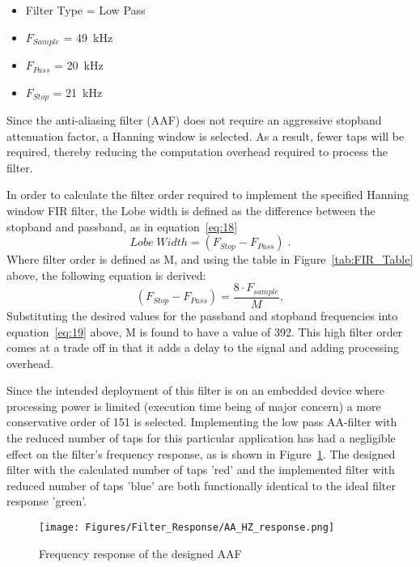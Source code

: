 \begin{itemize}
    \item Filter Type = Low Pass 
    \item $F_{Sample}$ = \qty{49}{\kHz} 
    \item $F_{Pass}$   = \qty{20}{\kHz} 
    \item $F_{Stop}$   = \qty{21}{\kHz} 
\end{itemize}
Since the  anti-aliasing filter (AAF) does not require an aggressive stopband attenuation factor, a Hanning window is selected. As a result, fewer taps will
be required, thereby reducing the computation overhead required to process the filter.
\par
In order to calculate the filter order required to implement the specified Hanning window FIR filter, the Lobe width is defined as the difference between the stopband and passband, as in equation~\ref{eq:18}
\begin{equation}
    Lobe \; Width = (F_{Stop} - F_{Pass}) \; .
    \label{eq:18}
\end{equation}
Where filter order is defined as M, and using the table in Figure~\ref{tab:FIR_Table} above, the following equation is derived:
\begin{equation}
    (F_{Stop} - F_{Pass}) = \frac{8 \cdot F_{sample}}{M},
    \label{eq:19}
\end{equation}
Substituting the desired values for the passband and stopband frequencies into equation~\ref{eq:19} above, M is found to have a value of 392. This high filter order comes at a trade off in that it adds a delay to the signal and adding processing overhead. 
\par
Since the intended deployment of this filter is on an embedded device where processing power is limited (execution time being of major concern) a more conservative order of 151 is selected. Implementing the low pass AA-filter with the reduced number of taps for this particular application has had a negligible effect on the filter's frequency response, as is shown in Figure~\ref{fig:FIR_AA}. The designed filter with the calculated number of taps 'red' and the implemented filter with reduced number of taps 'blue' are both functionally identical to the ideal filter response 'green'.

\begin{figure}[H]
    \centering
    \texttt{[image: Figures/Filter\_Response/AA\_HZ\_response.png]}
    \caption{Frequency response of the designed AAF}
    \label{fig:FIR_AA}
\end{figure}

